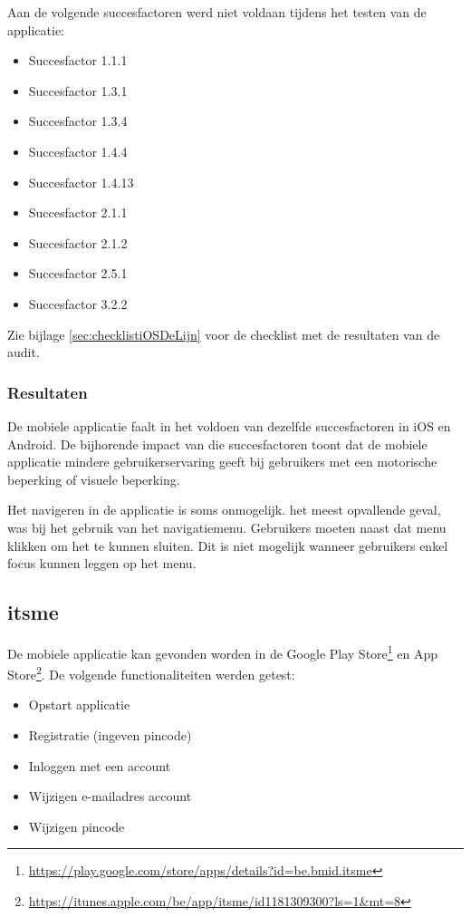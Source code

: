 Aan de volgende succesfactoren werd niet voldaan tijdens het testen van de applicatie: \begin{itemize}
        \item Succesfactor 1.1.1
    \item Succesfactor 1.3.1
    \item Succesfactor 1.3.4
    \item Succesfactor 1.4.4
    \item Succesfactor 1.4.13
    \item Succesfactor 2.1.1
    \item Succesfactor 2.1.2
    \item Succesfactor 2.5.1
    \item Succesfactor 3.2.2
\end{itemize}

Zie bijlage \ref{sec:checklistiOSDeLijn} voor de checklist met de resultaten van de audit.

\subsubsection{Resultaten}
De mobiele applicatie faalt in het voldoen van dezelfde succesfactoren in iOS en Android. De bijhorende impact van die succesfactoren toont dat de mobiele applicatie mindere gebruikerservaring geeft bij gebruikers met een motorische beperking of visuele beperking.

Het navigeren in de applicatie is soms onmogelijk. het meest opvallende geval, was bij het gebruik van het navigatiemenu. Gebruikers moeten naast dat menu klikken om het te kunnen sluiten. Dit is niet mogelijk wanneer gebruikers enkel focus kunnen leggen op het menu.

\subsection{itsme}
De mobiele applicatie kan gevonden worden in de Google Play Store\footnote{\url{https://play.google.com/store/apps/details?id=be.bmid.itsme}} en App Store\footnote{\url{https://itunes.apple.com/be/app/itsme/id1181309300?ls=1&mt=8}}. De volgende functionaliteiten werden getest: \begin{itemize}
    \item Opstart applicatie
    \item Registratie (ingeven pincode)
    \item Inloggen met een account
    \item Wijzigen e-mailadres account
    \item Wijzigen pincode 
\end{itemize}
